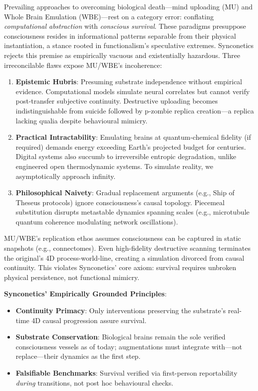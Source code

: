 \documentclass[10pt]{article}
\begin{document}
\begin{sloppypar}
  Prevailing approaches to overcoming biological death—mind uploading (MU) and Whole Brain Emulation (WBE)—rest on a category error: conflating \textit{computational abstraction} with \textit{conscious survival}. These paradigms presuppose consciousness resides in informational patterns separable from their physical instantiation, a stance rooted in functionalism’s speculative extremes. Synconetics rejects this premise as empirically vacuous and existentially hazardous. Three irreconcilable flaws expose MU/WBE’s incoherence:

  \begin{enumerate}
    \item \textbf{Epistemic Hubris}: Presuming substrate independence without empirical evidence. Computational models simulate neural correlates but cannot verify post-transfer subjective continuity. Destructive uploading becomes indistinguishable from suicide followed by p-zombie replica creation—a replica lacking qualia despite behavioural mimicry.
    \item \textbf{Practical Intractability}: Emulating brains at quantum-chemical fidelity (if required) demands energy exceeding Earth’s projected budget for centuries. Digital systems also succumb to irreversible entropic degradation, unlike engineered open thermodynamic systems. To simulate reality, we asymptotically approach infinity.
    \item \textbf{Philosophical Naivety}: Gradual replacement arguments (e.g., Ship of Theseus protocols) ignore consciousness’s causal topology. Piecemeal substitution disrupts metastable dynamics spanning scales (e.g., microtubule quantum coherence modulating network oscillations).
  \end{enumerate}

  MU/WBE’s replication ethos assumes consciousness can be captured in static snapshots (e.g., connectomes). Even high-fidelity destructive scanning terminates the original’s 4D process-world-line, creating a simulation divorced from causal continuity. This violates Synconetics’ core axiom: survival requires unbroken physical persistence, not functional mimicry.

  \textbf{Synconetics’ Empirically Grounded Principles}:
  \begin{itemize}
    \item \textbf{Continuity Primacy}: Only interventions preserving the substrate’s real-time 4D causal progression assure survival.
    \item \textbf{Substrate Conservation}: Biological brains remain the sole verified consciousness vessels as of today; augmentations must integrate with—not replace—their dynamics as the first step.
    \item \textbf{Falsifiable Benchmarks}: Survival verified via first-person reportability \textit{during} transitions, not post hoc behavioural checks.
  \end{itemize}


\end{sloppypar}
\end{document}
